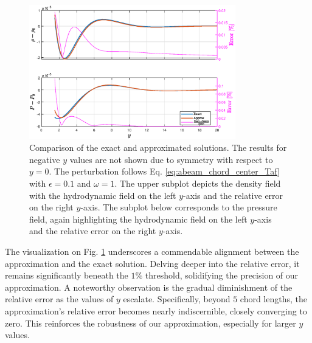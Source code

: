 \begin{figure}[H]
    \centering
    \includegraphics[width=0.8\textwidth]{drawings/ACC.eps} 
    \caption{\footnotesize{Comparison of the exact and approximated solutions. The results for negative $y$ values are not shown due to symmetry with respect to $y=0$. The perturbation follows Eq. \ref{eq:abeam_chord_center_Taf} with $\epsilon = 0.1$ and $\omega = 1$. The upper subplot depicts the density field with the hydrodynamic field on the left $y$-axis and the relative error on the right $y$-axis. The subplot below corresponds to the pressure field, again highlighting the hydrodynamic field on the left $y$-axis and the relative error on the right $y$-axis.}}
    \label{fig:ACC_comparison}
\end{figure}
The visualization on Fig. \ref{fig:ACC_comparison} underscores a commendable alignment between the approximation and the exact solution. Delving deeper into the relative error, it remains significantly beneath the $1\%$ threshold, solidifying the precision of our approximation. A noteworthy observation is the gradual diminishment of the relative error as the values of $y$ escalate. Specifically, beyond $5$ chord lengths, the approximation's relative error becomes nearly indiscernible, closely converging to zero. This reinforces the robustness of our approximation, especially for larger $y$ values.